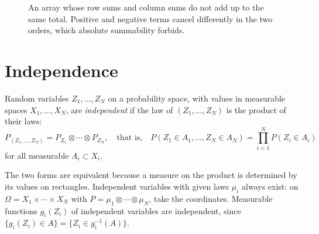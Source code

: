 \begin{notechapter}
\begin{figure}[ht]
\centering
{}
\caption{An array whose row sums and column sums do not add up to the
same total. Positive and negative terms cancel differently in the two
orders, which absolute summability forbids.}
\label{fubini:fig:array}
\end{figure}

\section{Independence}\label{fubini:sec:independence}

\begin{definition}[Independence]\label{fubini:def:independent}
Random variables $Z_1,\dots,Z_N$ on a probability space, with values in
measurable spaces $X_1,\dots,X_N$, are \emph{independent} if the law of
$(Z_1,\dots,Z_N)$ is the product of their laws:
\[
  P_{(Z_1,\dots,Z_N)} = P_{Z_1}\otimes\cdots\otimes P_{Z_N} ,
  \quad\text{that is,}\quad
  P(Z_1\in A_1,\dots,Z_N\in A_N) = \prod_{i=1}^NP(Z_i\in A_i)
\]
for all measurable $A_i\subset X_i$.
\end{definition}

The two forms are equivalent because a measure on the product is
determined by its values on rectangles. Independent variables with given
laws $\mu_i$ always exist: on $\Omega = X_1\times\cdots\times X_N$ with
$P = \mu_1\otimes\cdots\otimes\mu_N$, take the coordinates. Measurable
functions $g_i(Z_i)$ of independent variables are independent, since
$\{g_i(Z_i)\in A\} = \{Z_i\in g_i^{-1}(A)\}$.


\end{notechapter}
